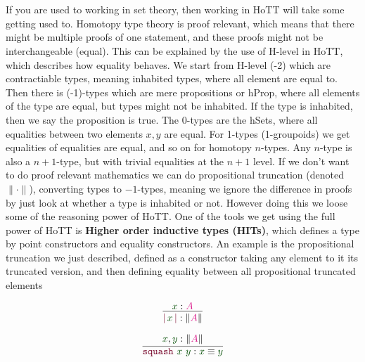 \documentclass[twoside,11pt,openright]{report}
\theoremstyle{plain} %
\theoremstyle{definition}
\theoremstyle{remark}
\newcommand*{\term}[1]{\textcolor{green!30!black}{#1}} %
\newcommand*{\type}[1]{\textcolor{magenta!90!black}{#1}}
\newcommand*{\constructor}[1]{\textcolor{purple!60!black}{\ensuremath{\mathtt{#1}}}}
\begin{document}
~\\ \\
If you are used to working in set theory, then working in HoTT will take some getting used to. Homotopy type theory is proof relevant, which means that there might be multiple proofs of one statement, and these proofs might not be interchangeable (equal). This can be explained by the use of H-level in HoTT, which describes how equality behaves. We start from H-level (-2) which are contractiable types, meaning inhabited types, where all element are equal to. Then there is (-1)-types which are mere propositions or hProp, where all elements of the type are equal, but types might not be inhabited. If the type is inhabited, then we say the proposition is true. The 0-types are the hSets, where all equalities between two elements \(x,y\) are equal. For 1-types (1-groupoids) we get equalities of equalities are equal, and so on for homotopy \(n\)-types. Any \(n\)-type is also a \(n+1\)-type, but with trivial equalities at the \(n+1\) level. If we don't want to do proof relevant mathematics we can do propositional truncation (denoted \(\|{\cdot}\|\)), converting types to \(-1\)-types, meaning we ignore the difference in proofs by just look at whether a type is inhabited or not. However doing this we loose some of the reasoning power of HoTT. One of the tools we get using the full power of HoTT is \textbf{Higher order inductive types (HITs)}, which defines a type by point constructors and equality constructors. An example is the propositional truncation we just described, defined as a constructor taking any element to it its truncated version, and then defining equality between all propositional truncated elements
\begin{center}
  \strut
  \hfill
  \begin{minipage}{0.25\linewidth}
    \begin{equation}
      \vcenter{\infer{\constructor{|}\,\term{x}\,\constructor{|} : \| \type{A} \|}{\term{x} : \type{A}}}
    \end{equation}
  \end{minipage}
  \hfill
  \begin{minipage}{0.3\linewidth}
    \begin{equation}
      \vcenter{\infer{\constructor{squash}~\term{x}~\term{y} : \term{x} \equiv \term{y}}{\term{x}, \term{y} : \|\type{A}\|}}
    \end{equation}
  \end{minipage}
  \hfill
  \strut
\end{center}
\end{document}

